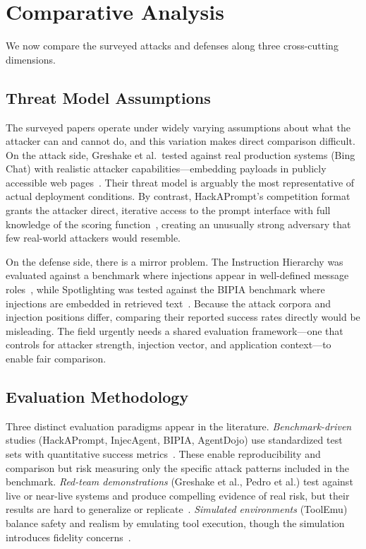 \section{Comparative Analysis}
\label{sec:comparison}

We now compare the surveyed attacks and defenses along three cross-cutting dimensions.

\subsection{Threat Model Assumptions}

The surveyed papers operate under widely varying assumptions about what the attacker can and cannot do, and this variation makes direct comparison difficult. On the attack side, Greshake et al.\ tested against real production systems (Bing Chat) with realistic attacker capabilities---embedding payloads in publicly accessible web pages~\cite{greshake2023indirect}. Their threat model is arguably the most representative of actual deployment conditions. By contrast, HackAPrompt's competition format grants the attacker direct, iterative access to the prompt interface with full knowledge of the scoring function~\cite{perez2022hackaprompt}, creating an unusually strong adversary that few real-world attackers would resemble.

On the defense side, there is a mirror problem. The Instruction Hierarchy was evaluated against a benchmark where injections appear in well-defined message roles~\cite{wallace2024hierarchy}, while Spotlighting was tested against the BIPIA benchmark where injections are embedded in retrieved text~\cite{hines2024spotlighting}. Because the attack corpora and injection positions differ, comparing their reported success rates directly would be misleading. The field urgently needs a shared evaluation framework---one that controls for attacker strength, injection vector, and application context---to enable fair comparison.

\subsection{Evaluation Methodology}

Three distinct evaluation paradigms appear in the literature. \emph{Benchmark-driven} studies (HackAPrompt, InjecAgent, BIPIA, AgentDojo) use standardized test sets with quantitative success metrics~\cite{perez2022hackaprompt, zhan2024injecagent, yi2023bipia, debenedetti2024agentdojo}. These enable reproducibility and comparison but risk measuring only the specific attack patterns included in the benchmark. \emph{Red-team demonstrations} (Greshake et al., Pedro et al.) test against live or near-live systems and produce compelling evidence of real risk, but their results are hard to generalize or replicate~\cite{greshake2023indirect, pedro2023prompt}. \emph{Simulated environments} (ToolEmu) balance safety and realism by emulating tool execution, though the simulation introduces fidelity concerns~\cite{ruan2024toolemu}.

